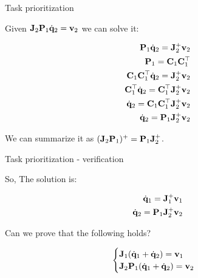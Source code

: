 \documentclass{beamer}
\newcommand{\dq} {\dot{\mathbf{q}}}
\begin{document}
\begin{frame}{Task prioritization}
	\begin{flushleft}
		
		Given $\bo{J}_2 \bo{P}_1 \dq_2 =\bo{v}_2$ we can solve it:
		
		\begin{align}
			\bo{P}_1 \dq_2 =\bo{J}_2^+ \bo{v}_2 \\
			\bo{P}_1 = \bo{C}_1 \bo{C}_1\T \\
		    \bo{C}_1 \bo{C}_1\T \dq_2 =\bo{J}_2^+ \bo{v}_2 \\
			 \bo{C}_1\T \dq_2 =\bo{C}_1\T \bo{J}_2^+ \bo{v}_2 \\
			 \dq_2 = \bo{C}_1 \bo{C}_1\T \bo{J}_2^+ \bo{v}_2 \\
			 \dq_2 = \bo{P}_1 \bo{J}_2^+ \bo{v}_2
		\end{align}		
	
		We can summarize it as $(\mathbf{J}_2 \mathbf{P}_1)^+  = \mathbf{P}_1 \mathbf{J}_2^+$.
		
	\end{flushleft}
\end{frame}



\begin{frame}{Task prioritization - verification}
	\begin{flushleft}
		
		So, The solution is: 
		
		\begin{align}
			\dq_1 = \bo{J}_1^+ \bo{v}_1 \\
			\dq_2 = \bo{P}_1 \bo{J}_2^+ \bo{v}_2
		\end{align}	
	
		Can we prove that the following holds?
		
		\begin{equation}
			\begin{cases}
				\bo{J}_1 (\dq_1 + \dq_2) =\bo{v}_1 \\
				\bo{J}_2 \bo{P}_1 (\dq_1 + \dq_2) =\bo{v}_2
			\end{cases}
		\end{equation}			
		
	\end{flushleft}
\end{frame}
\end{document}
